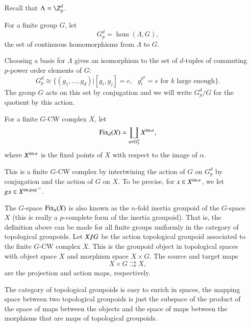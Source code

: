 Recall that $\Lambda = \Z_{p}^d$.

\begin{definition}
For a finite group $G$, let
\[
G_{p}^{d} = \hom(\Lambda,G),
\]
the set of continuous homomorphisms from $\Lambda$ to $G$.
\end{definition}

Choosing a basis for $\Lambda$ gives an isomorphism to the set of $d$-tuples of commuting $p$-power order elements of $G$:
\[
G_{p}^{d} \cong \{(g_1,\ldots, g_d)|[g_i,g_j] = e, \text{ } g_{i}^{p^k}=e \text{ for } k \text{ large enough}\}.
\]
The group $G$ acts on this set by conjugation and we will write $G_{p}^{d}/G$ for the quotient by this action.

\begin{definition} \label{fix}
For a finite $G$-CW complex $X$, let
\[
\operatorname{Fix}_d(X) = \coprod_{\alpha \in G_{p}^{d}} X^{\operatorname{im} \alpha},
\]
where $X^{\operatorname{im} \alpha}$ is the fixed points of $X$ with respect to the image of $\alpha$.
\end{definition}

This is a finite $G$-CW complex by intertwining the action of $G$ on $G_{p}^{d}$ by conjugation and the action of $G$ on $X$. To be precise, for $x \in X^{\operatorname{im} \alpha}$, we let $gx \in X^{\operatorname{im} g \alpha g^{-1}}$.

The $G$-space $\operatorname{Fix}_n(X)$ is also known as the $n$-fold inertia groupoid of the $G$-space $X$ (this is really a $p$-complete form of the inertia groupoid). That is, the definition above can be made for all finite groups uniformly in the category of topological groupoids. Let $X /\!\!/ G$ be the action topological groupoid associated to the finite $G$-CW complex $X$. This is the groupoid object in topological spaces with object space $X$ and morphism space $X \times G$. The source and target maps
\[
X \times G \rightrightarrows X,
\]
are the projection and action maps, respectively.


The category of topological groupoids is easy to enrich in spaces, the mapping space between two topological groupoids is just the subspace of the product of the space of maps between the objects and the space of maps between the morphisms that are maps of topological groupoids. 

